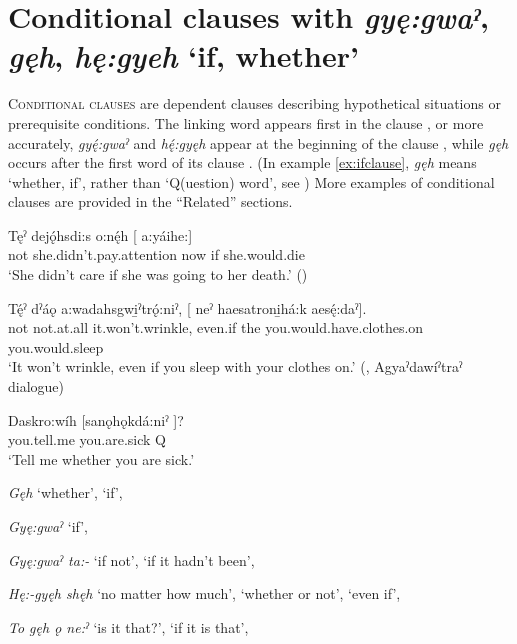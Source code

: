 \section{Conditional clauses with \textit{gyę:gwaˀ}, \textit{gęh}, \textit{hę:gyeh} ‘if, whether’} \label{ch:Conditional clauses with [gyę:gwaˀ], [gęh], [hę:gyeh] ‘if, whether’}
\textsc{Conditional clauses} are dependent clauses describing hypothetical situations or prerequisite conditions. The linking word appears first in the clause , or more accurately, \textit{gyę́:gwaˀ} and \textit{hę́:gyęh} appear at the beginning of the clause , while \textit{gęh} occurs after the first word of its clause . (In example \ref{ex:ifclause}, \textit{gęh} means ‘whether, if’, rather than ‘Q(uestion) word’, see ) More examples of conditional clauses are provided in the “Related” sections.

\ea\label{ex:ifclause2}
\gll Tęˀ dejǫ́hsdi:s o:nę́h  [ a:yáihe:]\\
not she.didn’t.pay.attention now if she.would.die\\
\glt ‘She didn’t care if she was going to her death.’ (\cite{carrier_legends_2013})
\z

\ea\label{ex:ifclause3} 
\gll Tę́ˀ dˀáǫ a:wadahsgwi̱ˀtrǫ́:niˀ, [ neˀ haesatroni̱há:k aesę́:daˀ].\\
not not.at.all it.won’t.wrinkle, even.if the you.would.have.clothes.on you.would.sleep\\
\glt ‘It won’t wrinkle, even if you sleep with your clothes on.’ (\cite[225]{mithun_watewayestanih_1984}, Agyaˀdawíˀtraˀ dialogue)
\z

\ea\label{ex:ifclause} 
\gll Daskro:wíh  [sanǫhǫkdá:niˀ ]? \\
you.tell.me you.are.sick Q\\
\glt ‘Tell me whether you are sick.’ 
\z



\begin{CayugaRelated}
\item{}\textit{Gęh} ‘whether’, ‘if’, 

\item{}\textit{Gyę:gwaˀ} ‘if’, 

\item{}\textit{Gyę:gwaˀ ta:- } ‘if not’, ‘if it hadn’t been’, 

\item{}\textit{Hę:-gyęh shęh} ‘no matter how much’, ‘whether or not’, ‘even if’, 

\item{}\textit{To gęh ǫ ne:ˀ} ‘is it that?’, ‘if it is that’, 
\end{CayugaRelated}

